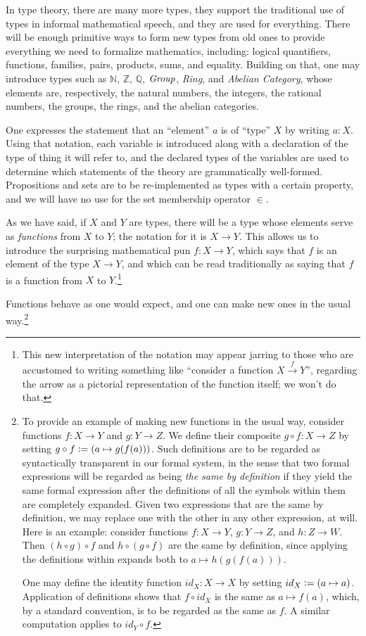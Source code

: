 \documentclass[letter,12pt]{amsart}
\theoremstyle{definition}
\theoremstyle{remark}
\numberwithin{equation}{section}
\newcommand{\QQ}{\mathbb{Q}}
\newcommand{\ZZ}{\mathbb{Z}}
\newcommand{\NN}{\mathbb{N}}
\newcommand{\defeq}{\vcentcolon=}
\begin{document}
In type theory, there are many more types, they support the traditional use of types in informal mathematical speech, and they are used for
everything.  There will be enough primitive ways to form new types from old ones to provide everything we need to formalize mathematics,
including: logical quantifiers, functions, families, pairs, products, sums, and equality.  Building on that, one may introduce types such as
$\NN$, $\ZZ$, $\QQ$, ${\it Group}$, {\it Ring}, and {\it Abelian Category}, whose elements are, respectively, the natural numbers, the integers, the rational
numbers, the groups, the rings, and the abelian categories.

One expresses the statement that an ``element'' $a$ is of ``type'' $X$ by writing $a:X$.  Using that notation, each variable is introduced along
with a declaration of the type of thing it will refer to, and the declared types of the variables are used to determine which statements of the
theory are grammatically well-formed.  Propositions and sets are to be re-implemented as types with a certain property, and we will have no use
for the set membership operator $\in$.

As we have said, if $X$ and $Y$ are types, there will be a type whose elements serve as {\em functions} from $X$ to $Y$; the notation for it is
$X \to Y$.  This allows us to introduce the surprising mathematical pun $f : X \to Y$, which says that $f$ is an element of the type $X \to Y$,
and which can be read traditionally as saying that $f$ is a function from $X$ to $Y$.\footnote{This new interpretation of the notation may
  appear jarring to those who are accustomed to writing something like ``consider a function $X \xrightarrow f Y$'', regarding the arrow as a
  pictorial representation of the function itself; we won't do that.}

Functions behave as one would expect, and one can make new ones in the usual way.\footnote{ To provide an example of making new functions in the
  usual way, consider functions $f : X \to Y$ and $g : Y \to Z$.  We define their composite $g \circ f : X \to Z$ by setting $g \circ f \defeq
  (a \mapsto g(f(a)))$.  Such definitions are to be regarded as syntactically transparent in our formal system, in the sense that two formal
  expressions will be regarded as being {\em the same by definition} if they yield the same formal expression after the definitions of all the
  symbols within them are completely expanded.  Given two expressions that are the same by definition, we may replace one with the other in any
  other expression, at will.  Here is an example: consider functions $f : X \to Y$, $g : Y \to Z$, and $h : Z \to W$.  Then $(h \circ g) \circ
  f$ and $h \circ (g \circ f)$ are the same by definition, since applying the definitions within expands both to $a \mapsto h(g(f(a)))$.

  One may define the identity function $id_X : X \to X$ by setting $id_X \defeq (a \mapsto a)$.  Application of definitions shows that $f \circ
  id_X$ is the same as $a \mapsto f(a)$, which, by a standard convention, is to be regarded as the same as $f$.  A similar computation applies
  to $id_Y \circ f$.
}
\end{document}

